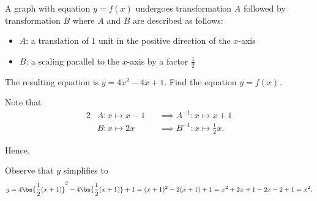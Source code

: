 \begin{problem}
    A graph with equation $y = f(x)$ undergoes transformation $A$ followed by transformation $B$ where $A$ and $B$ are described as follows:

    \begin{itemize}
        \item $A$: a translation of 1 unit in the positive direction of the $x$-axis
        \item $B$: a scaling parallel to the $x$-axis by a factor $\frac12$
    \end{itemize}

    The resulting equation is $y = 4x^2-4x+1$. Find the equation $y = f(x)$.
\end{problem}
\begin{solution}
    Note that
    \begin{alignat*}{2}
        &A \colon x \mapsto x-1 &&\implies A^{-1} \colon x \mapsto x+1\\
        &B \colon x \mapsto 2x &&\implies B^{-1} \colon x \mapsto \frac12 x.
    \end{alignat*}

    Hence,
    \begin{center}
    \end{center}

    Observe that $y$ simplifies to \[y = 4\bs{\frac12 (x+1)}^2-4\bs{\frac12 (x+1)}+1 = (x+1)^2-2(x+1)+1 = x^2 + 2x + 1 - 2x - 2 + 1 = x^2.\]
\end{solution}